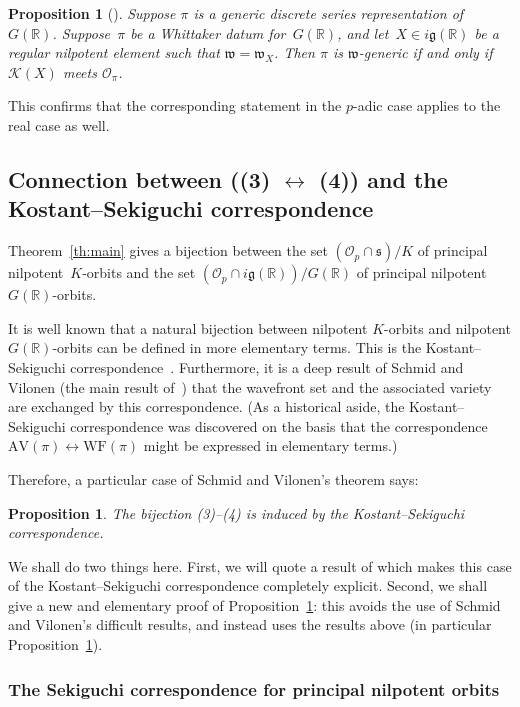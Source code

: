 \documentclass[10pt,leqno]{article}
\newtheorem{proposition}[equation]{Proposition}
\renewcommand{\O}{\mathcal O}
\newcommand{\R}{\mathbb R}
\newcommand{\g}{\mathfrak g}
\newcommand{\s}{\mathfrak s}
\newcommand{\w}{\mathfrak w}
\newcommand{\AV}{\mathrm{AV}}
\newcommand{\WF}{\mathrm{WF}}
\newcommand{\Op}{\O_p}
\newcommand{\Kostant}[1]{\mathcal{K}(#1)}
\begin{document}
\begin{proposition}[\cite{adams_kaletha}]\label{JeffTasho_criterion}
Suppose $\pi$ is a generic discrete series representation of~$G(\R)$. Suppose~$\pi$ be a Whittaker datum for~$G(\R)$, and let~$X \in i\g(\R)$ be a regular nilpotent element such that $\w = \w_X$. 
Then $\pi$ is $\w$-generic if and only if $\Kostant{X}$ meets $\mathcal{O}_\pi$. 
\end{proposition}


This confirms that  the corresponding statement  in the $p$-adic case \cite{debacker_reeder_generic, kaletha_epipelagic}
applies to the real case as well.


\subsection{Connection between ((3) $\leftrightarrow$ (4)) and the Kostant--Sekiguchi correspondence } 

Theorem~\ref{th:main} gives a bijection between the set $(\Op \cap \s)/K$ of principal nilpotent~$K$-orbits and the set $(\Op \cap i\g(\R))/G(\R)$ of principal nilpotent~$G(\R)$-orbits. 

It is well known that a natural bijection between nilpotent $K$-orbits and nilpotent $G(\R)$-orbits can be defined in more elementary terms. This is the Kostant--Sekiguchi correspondence~\cite{}. Furthermore, it is a deep result of Schmid and Vilonen (the main result of~\cite{SV1}) that the wavefront set and the associated variety are exchanged by this correspondence. (As a historical aside, the Kostant--Sekiguchi correspondence was discovered on the basis that the correspondence $\AV(\pi) \leftrightarrow \WF(\pi)$ might be expressed in elementary terms.)

Therefore, a particular case of Schmid and Vilonen's theorem says: 
\begin{proposition} \label{Sekiguchi_result} The bijection (3)--(4) is induced by the Kostant--Sekiguchi correspondence.
\end{proposition} 
We shall do two things here. First, we will quote a result of \cite{AVAV} which makes this case of the Kostant--Sekiguchi correspondence completely explicit. Second, we shall give a new and elementary proof of Proposition~\ref{Sekiguchi_result}: this avoids the use of Schmid and Vilonen's difficult results, and instead uses the results above (in particular Proposition~\ref{JeffTasho_criterion}). 


\subsubsection{The Sekiguchi correspondence for principal nilpotent orbits}
\end{document}
